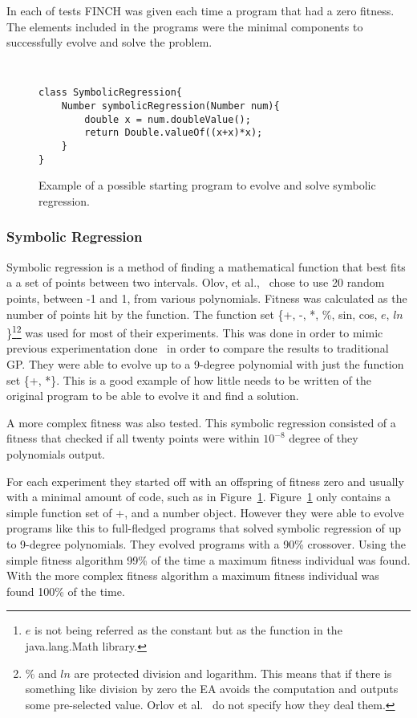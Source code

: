 \documentclass{sig-alternate}
\begin{document}
In each of tests FINCH was given each time a program that had a zero fitness. The elements included in the programs were the minimal components to successfully evolve and solve the problem.

\begin{figure}
\centering
{\tt
\begin{verbatim}
class SymbolicRegression{
    Number symbolicRegression(Number num){
        double x = num.doubleValue();
        return Double.valueOf((x+x)*x);
    }
}
\end{verbatim}
}
\caption{Example of a possible starting program to evolve and solve symbolic regression.}
\label{regression}
\end{figure}
\subsubsection{Symbolic Regression}
Symbolic regression is a method of finding a mathematical function that best fits a a set of points between two intervals. Olov, et al.,~\cite{FINCH:2011} chose to use 20 random points, between -1 and 1, from various polynomials. Fitness was calculated as the number of points hit by the function. The function set \{+, -, *, \%, sin, cos, $e$, $ln$\}\footnote{$e$ is not being referred as the constant but as the function in the java.lang.Math library.}\footnote{\% and $ln$ are protected division and logarithm. This means that if there is something like division by zero the EA avoids the computation and outputs some pre-selected value. Orlov et al.~\cite{FINCH:2011} do not specify how they deal them.} was used for most of their experiments. This was done in order to mimic previous experimentation done~\cite{koza:1992} in order to compare the results to traditional GP. They were able to evolve up to a 9-degree polynomial with just the function set \{+, *\}. This is a good example of how little needs to be written of the original program to be able to evolve it and find a solution.

A more complex fitness was also tested. This symbolic regression consisted of a fitness that checked if all twenty points were within $10^{-8}$ degree of they polynomials output. 

For each experiment they started off with an offspring of fitness zero and usually with a minimal amount of code, such as in Figure~\ref{regression}. Figure~\ref{regression} only contains a simple function set of {+, \*} and a number object. However they were able to evolve programs like this to full-fledged programs that solved symbolic regression of up to 9-degree polynomials. 
They evolved programs with a 90\% crossover. Using the simple fitness algorithm 99\% of the time a maximum fitness individual was found. With the more complex fitness algorithm a maximum fitness individual was found 100\% of the time.
\end{document}
